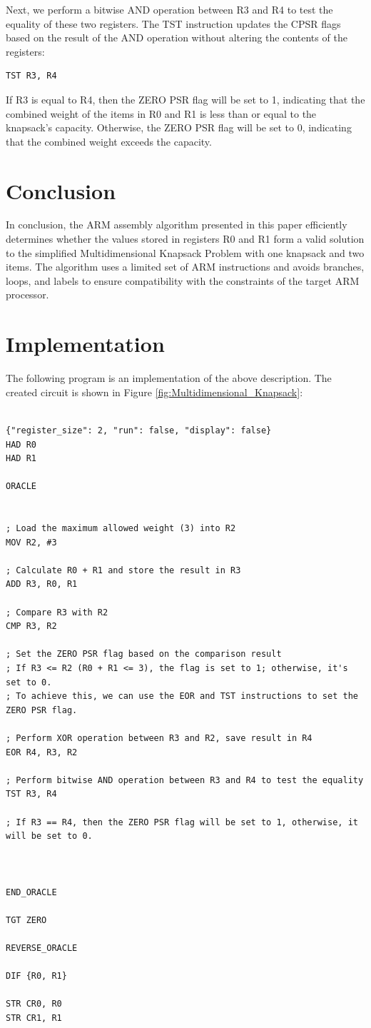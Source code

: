 Next, we perform a bitwise AND operation between R3 and R4 to test the equality of these two registers. The TST instruction updates the CPSR flags based on the result of the AND operation without altering the contents of the registers:
\begin{verbatim}
TST R3, R4
\end{verbatim}

If R3 is equal to R4, then the ZERO PSR flag will be set to 1, indicating that the combined weight of the items in R0 and R1 is less than or equal to the knapsack's capacity. Otherwise, the ZERO PSR flag will be set to 0, indicating that the combined weight exceeds the capacity.

\section{Conclusion}
In conclusion, the ARM assembly algorithm presented in this paper efficiently determines whether the values stored in registers R0 and R1 form a valid solution to the simplified Multidimensional Knapsack Problem with one knapsack and two items. The algorithm uses a limited set of ARM instructions and avoids branches, loops, and labels to ensure compatibility with the constraints of the target ARM processor.



\section{Implementation}

The following program is an implementation of the above description. The created circuit is shown in Figure \ref{fig:Multidimensional_Knapsack}:

\begin{lstlisting}

{"register_size": 2, "run": false, "display": false}
HAD R0
HAD R1

ORACLE


; Load the maximum allowed weight (3) into R2
MOV R2, #3

; Calculate R0 + R1 and store the result in R3
ADD R3, R0, R1

; Compare R3 with R2
CMP R3, R2

; Set the ZERO PSR flag based on the comparison result
; If R3 <= R2 (R0 + R1 <= 3), the flag is set to 1; otherwise, it's set to 0.
; To achieve this, we can use the EOR and TST instructions to set the ZERO PSR flag.

; Perform XOR operation between R3 and R2, save result in R4
EOR R4, R3, R2

; Perform bitwise AND operation between R3 and R4 to test the equality
TST R3, R4

; If R3 == R4, then the ZERO PSR flag will be set to 1, otherwise, it will be set to 0.



END_ORACLE

TGT ZERO

REVERSE_ORACLE

DIF {R0, R1}

STR CR0, R0
STR CR1, R1


\end{lstlisting}

